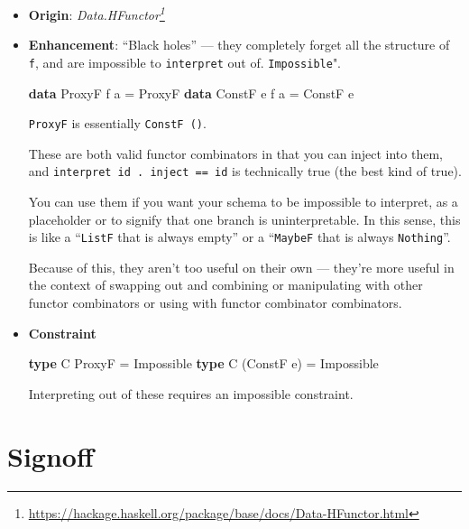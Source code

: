 \documentclass[]{article}
\newenvironment{Shaded}{}{}
\newcommand{\DataTypeTok}[1]{\textcolor[rgb]{0.56,0.13,0.00}{#1}}
\newcommand{\KeywordTok}[1]{\textcolor[rgb]{0.00,0.44,0.13}{\textbf{#1}}}
\newcommand{\NormalTok}[1]{#1}
\newcommand{\OtherTok}[1]{\textcolor[rgb]{0.00,0.44,0.13}{#1}}
\renewcommand{\href}[2]{#2\footnote{\url{#1}}}
\begin{document}
\begin{itemize}
\item
  \textbf{Origin}:
  \emph{\href{https://hackage.haskell.org/package/base/docs/Data-HFunctor.html}{Data.HFunctor}}
\item
  \textbf{Enhancement}: ``Black holes'' --- they completely forget all the
  structure of \texttt{f}, and are impossible to \texttt{interpret} out of.
  \texttt{Impossible}".

\begin{Shaded}
\begin{Highlighting}[]
\KeywordTok{data} \DataTypeTok{ProxyF}\NormalTok{ f a }\OtherTok{=} \DataTypeTok{ProxyF}
\KeywordTok{data} \DataTypeTok{ConstF}\NormalTok{ e f a }\OtherTok{=} \DataTypeTok{ConstF}\NormalTok{ e}
\end{Highlighting}
\end{Shaded}

  \texttt{ProxyF} is essentially \texttt{ConstF\ ()}.

  These are both valid functor combinators in that you can inject into them, and
  \texttt{interpret\ id\ .\ inject\ ==\ id} is technically true (the best kind
  of true).

  You can use them if you want your schema to be impossible to interpret, as a
  placeholder or to signify that one branch is uninterpretable. In this sense,
  this is like a ``\texttt{ListF} that is always empty'' or a ``\texttt{MaybeF}
  that is always \texttt{Nothing}''.

  Because of this, they aren't too useful on their own --- they're more useful
  in the context of swapping out and combining or manipulating with other
  functor combinators or using with functor combinator combinators.
\item
  \textbf{Constraint}

\begin{Shaded}
\begin{Highlighting}[]
\KeywordTok{type} \DataTypeTok{C} \DataTypeTok{ProxyF}     \OtherTok{=} \DataTypeTok{Impossible}
\KeywordTok{type} \DataTypeTok{C}\NormalTok{ (}\DataTypeTok{ConstF}\NormalTok{ e) }\OtherTok{=} \DataTypeTok{Impossible}
\end{Highlighting}
\end{Shaded}

  Interpreting out of these requires an impossible constraint.
\end{itemize}

\hypertarget{signoff}{%
\section{Signoff}\label{signoff}}
\end{document}

